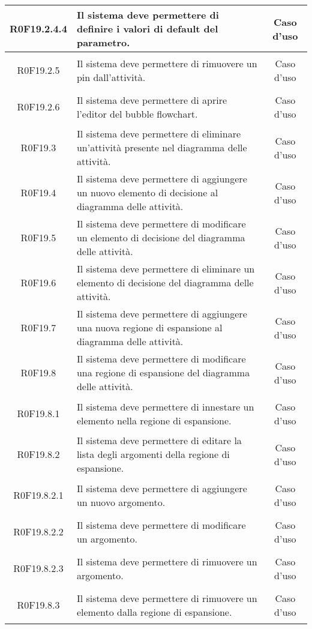 \documentclass[../AnalisiDeiRequisiti.tex]{subfiles}
\begin{document}
\begin{longtable}{|c|>{\centering}p{7cm}|c|}
\hypertarget{R0F19.2.4.4}{R0F19.2.4.4} & Il sistema deve permettere di definire i valori di default del parametro. & Caso d'uso \\ \hline
\hypertarget{R0F19.2.5}{R0F19.2.5} & Il sistema deve permettere di rimuovere un pin dall'attività. & Caso d'uso \\ \hline
\hypertarget{R0F19.2.6}{R0F19.2.6} & Il sistema deve permettere di aprire l'editor del bubble flowchart. & Caso d'uso \\ \hline
\hypertarget{R0F19.3}{R0F19.3} & Il sistema deve permettere di eliminare un'attività presente nel diagramma delle attività. & Caso d'uso \\ \hline
\hypertarget{R0F19.4}{R0F19.4} & Il sistema deve permettere di aggiungere un nuovo elemento di decisione al diagramma delle attività. & Caso d'uso \\ \hline
\hypertarget{R0F19.5}{R0F19.5} & Il sistema deve permettere di modificare un elemento di decisione del diagramma delle attività. & Caso d'uso \\ \hline
\hypertarget{R0F19.6}{R0F19.6} & Il sistema deve permettere di eliminare un elemento di decisione del diagramma delle attività. & Caso d'uso \\ \hline
\hypertarget{R0F19.7}{R0F19.7} & Il sistema deve permettere di aggiungere una nuova regione di espansione al diagramma delle attività. & Caso d'uso \\ \hline
\hypertarget{R0F19.8}{R0F19.8} & Il sistema deve permettere di modificare una regione di espansione del diagramma delle attività. & Caso d'uso \\ \hline
\hypertarget{R0F19.8.1}{R0F19.8.1} & Il sistema deve permettere di innestare un elemento nella regione di espansione. & Caso d'uso \\ \hline
\hypertarget{R0F19.8.2}{R0F19.8.2} & Il sistema deve permettere di editare la lista degli argomenti della regione di espansione. & Caso d'uso \\ \hline
\hypertarget{R0F19.8.2.1}{R0F19.8.2.1} & Il sistema deve permettere di aggiungere un nuovo argomento. & Caso d'uso \\ \hline
\hypertarget{R0F19.8.2.2}{R0F19.8.2.2} & Il sistema deve permettere di modificare un argomento. & Caso d'uso \\ \hline
\hypertarget{R0F19.8.2.3}{R0F19.8.2.3} & Il sistema deve permettere di rimuovere un argomento. & Caso d'uso \\ \hline
\hypertarget{R0F19.8.3}{R0F19.8.3} & Il sistema deve permettere di rimuovere un elemento dalla regione di espansione. & Caso d'uso \\ \hline

\end{longtable}
\end{document}
